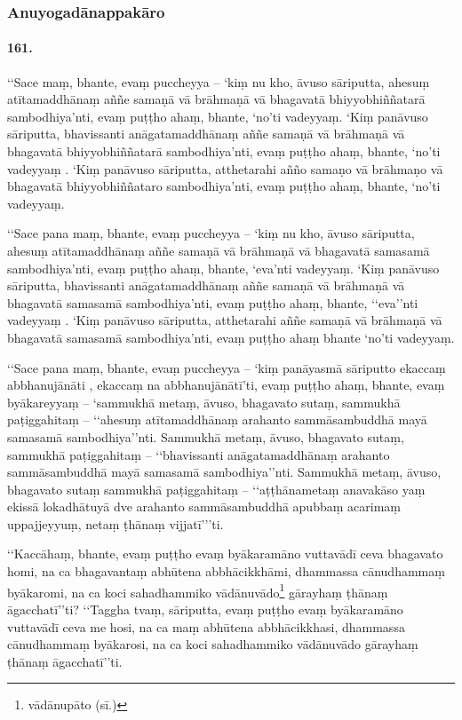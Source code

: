 \subsubsection{Anuyogadānappakāro}

\paragraph{161.} ‘‘Sace maṃ, bhante, evaṃ puccheyya – ‘kiṃ nu kho, āvuso sāriputta, ahesuṃ atītamaddhānaṃ aññe samaṇā vā brāhmaṇā vā bhagavatā bhiyyobhiññatarā sambodhiya’nti, evaṃ puṭṭho ahaṃ, bhante, ‘no’ti vadeyyaṃ. ‘Kiṃ panāvuso sāriputta, bhavissanti anāgatamaddhānaṃ aññe samaṇā vā brāhmaṇā vā bhagavatā bhiyyobhiññatarā sambodhiya’nti, evaṃ puṭṭho ahaṃ, bhante, ‘no’ti vadeyyaṃ . ‘Kiṃ panāvuso sāriputta, atthetarahi añño samaṇo vā brāhmaṇo vā bhagavatā bhiyyobhiññataro sambodhiya’nti, evaṃ puṭṭho ahaṃ, bhante, ‘no’ti vadeyyaṃ.

‘‘Sace pana maṃ, bhante, evaṃ puccheyya – ‘kiṃ nu kho, āvuso sāriputta, ahesuṃ atītamaddhānaṃ aññe samaṇā vā brāhmaṇā vā bhagavatā samasamā sambodhiya’nti, evaṃ puṭṭho ahaṃ, bhante, ‘eva’nti vadeyyaṃ. ‘Kiṃ panāvuso sāriputta, bhavissanti anāgatamaddhānaṃ aññe samaṇā vā brāhmaṇā vā bhagavatā samasamā sambodhiya’nti, evaṃ puṭṭho ahaṃ, bhante, ‘‘eva’’nti vadeyyaṃ . ‘Kiṃ panāvuso sāriputta, atthetarahi aññe samaṇā vā brāhmaṇā vā bhagavatā samasamā sambodhiya’nti, evaṃ puṭṭho ahaṃ bhante ‘no’ti vadeyyaṃ.

‘‘Sace pana maṃ, bhante, evaṃ puccheyya – ‘kiṃ panāyasmā sāriputto ekaccaṃ abbhanujānāti , ekaccaṃ na abbhanujānātī’ti, evaṃ puṭṭho ahaṃ, bhante, evaṃ byākareyyaṃ – ‘sammukhā metaṃ, āvuso, bhagavato sutaṃ, sammukhā paṭiggahitaṃ – ‘‘ahesuṃ atītamaddhānaṃ arahanto sammāsambuddhā mayā samasamā sambodhiya’’nti. Sammukhā metaṃ, āvuso, bhagavato sutaṃ, sammukhā paṭiggahitaṃ – ‘‘bhavissanti anāgatamaddhānaṃ arahanto sammāsambuddhā mayā samasamā sambodhiya’’nti. Sammukhā metaṃ, āvuso, bhagavato sutaṃ sammukhā paṭiggahitaṃ – ‘‘aṭṭhānametaṃ anavakāso yaṃ ekissā lokadhātuyā dve arahanto sammāsambuddhā apubbaṃ acarimaṃ uppajjeyyuṃ, netaṃ ṭhānaṃ vijjatī’’’ti.

‘‘Kaccāhaṃ, bhante, evaṃ puṭṭho evaṃ byākaramāno vuttavādī ceva bhagavato homi, na ca bhagavantaṃ abhūtena abbhācikkhāmi, dhammassa cānudhammaṃ byākaromi, na ca koci sahadhammiko vādānuvādo\footnote{vādānupāto (sī.)} gārayhaṃ ṭhānaṃ āgacchatī’’ti? ‘‘Taggha tvaṃ, sāriputta, evaṃ puṭṭho evaṃ byākaramāno vuttavādī ceva me hosi, na ca maṃ abhūtena abbhācikkhasi, dhammassa cānudhammaṃ byākarosi, na ca koci sahadhammiko vādānuvādo gārayhaṃ ṭhānaṃ āgacchatī’’ti.


